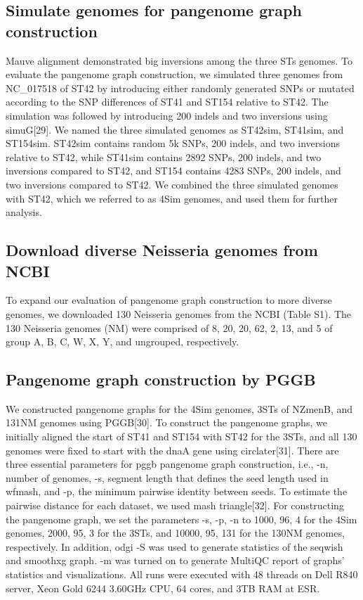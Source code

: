 \subsection{Simulate genomes for pangenome graph construction}
Mauve alignment demonstrated big inversions among the three STs genomes.  To evaluate the pangenome graph construction, we simulated three genomes from NC_017518 of ST42 by introducing either randomly generated SNPs or mutated according to the SNP differences of ST41 and ST154 relative to ST42. The simulation was followed by introducing 200 indels and two inversions using simuG[29]. We named the three simulated genomes as ST42sim, ST41sim, and ST154sim. ST42sim contains random 5k SNPs, 200 indels, and two inversions relative to ST42, while ST41sim contains 2892 SNPs, 200 indels, and two inversions compared to ST42, and ST154 contains 4283 SNPs, 200 indels, and two inversions compared to ST42. We combined the three simulated genomes with ST42, which we referred to as 4Sim genomes, and used them for further analysis.
\subsection{Download diverse Neisseria genomes from NCBI}
To expand our evaluation of pangenome graph construction to more diverse genomes, we downloaded 130 Neisseria genomes from the NCBI (Table S1). The 130 Neisseria genomes (NM) were comprised of 8, 20, 20, 62, 2, 13, and 5 of group A, B, C, W, X, Y, and ungrouped, respectively.
\subsection{Pangenome graph construction by PGGB }
We constructed pangenome graphs for the 4Sim genomes, 3STs of NZmenB, and 131NM genomes using PGGB[30]. To construct the pangenome graphs, we initially aligned the start of ST41 and ST154 with ST42 for the 3STs, and all 130 genomes were fixed to start with the dnaA gene using circlater[31].
There are three essential parameters for pggb pangenome graph construction, i.e., -n, number of genomes, -s, segment length that defines the seed length used in wfmash, and -p, the minimum pairwise identity between seeds. To estimate the pairwise distance for each dataset, we used mash triangle[32]. For constructing the pangenome graph, we set the parameters -s, -p, -n to 1000, 96, 4 for the 4Sim genomes, 2000, 95, 3 for the 3STs, and 10000, 95, 131 for the 130NM genomes, respectively.  In addition, odgi -S was used to generate statistics of the seqwish and smoothxg graph. -m was turned on to generate MultiQC report of graphs' statistics and visualizations. All runs were executed with 48 threads on Dell R840 server, Xeon Gold 6244 3.60GHz CPU, 64 cores, and 3TB RAM at ESR. 
